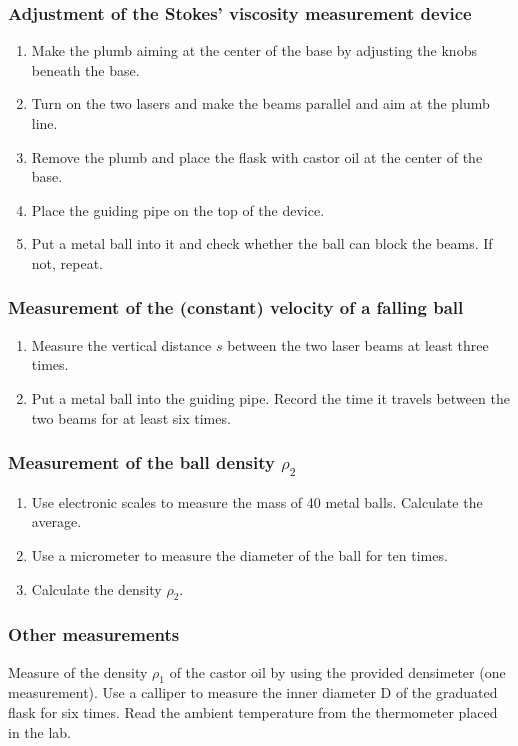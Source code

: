 \documentclass[12pt]{article}
\begin{document}
        \subsubsection{Adjustment of the Stokes' viscosity measurement device}
            \begin{enumerate}
                \item Make the plumb aiming at the center of the base by adjusting the knobs beneath the base.
                \item Turn on the two lasers and make the beams parallel and aim at the plumb line.
                \item Remove the plumb and place the flask with castor oil at the center of the base.
                \item Place the guiding pipe on the top of the device.
                \item Put a metal ball into it and check whether the ball can block the beams. If not, repeat. 
            \end{enumerate}
        \subsubsection{Measurement of the (constant) velocity of a falling ball}
            \begin{enumerate}
                \item Measure the vertical distance $s$ between the two laser beams at least three times.
                \item Put a metal ball into the guiding pipe. Record the time it travels between the two beams for at least six times.
            \end{enumerate}
        \subsubsection{Measurement of the ball density $\rho_2$}
            \begin{enumerate}
                \item Use electronic scales to measure the mass of 40 metal balls. Calculate the average.
                \item Use a micrometer to measure the diameter of the ball for ten times.
                \item Calculate the density $\rho_2$.
            \end{enumerate}
        \subsubsection{Other measurements}
            Measure of the density $\rho_1$ of the castor oil by using the provided densimeter (one
            measurement). Use a calliper to measure the inner diameter D of the graduated
            flask for six times. Read the ambient temperature from the thermometer placed in
            the lab.  
\end{document}

